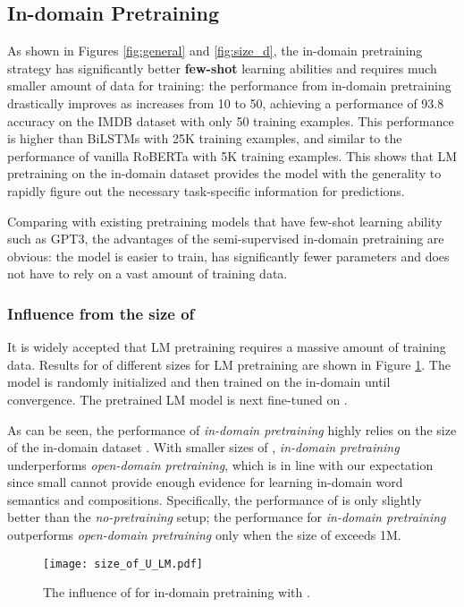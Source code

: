 \documentclass[11pt,a4paper]{article}
\begin{document}
\subsection{In-domain Pretraining}
As shown in Figures \ref{fig:general} and \ref{fig:size_d}, 
the  in-domain pretraining strategy has significantly better {\bf few-shot} learning abilities and
requires much smaller amount of  data for training:
the performance 
from in-domain pretraining
drastically improves as   increases from 10 to  50, 
achieving a performance of 93.8 accuracy on the IMDB dataset with only 50 training examples.
This performance is 
higher 
 than BiLSTMs with 25K training examples, and similar to the performance of vanilla RoBERTa with 5K training examples. 
This shows that  LM pretraining on the in-domain dataset  provides the model with the generality to rapidly figure out the necessary task-specific information for predictions. 

Comparing with existing  pretraining models that have few-shot learning ability such as GPT3, the advantages of the semi-supervised in-domain pretraining are obvious: the model
is easier to train, 
 has significantly fewer parameters and does not have to rely on a vast amount of training data.

\subsubsection{Influence from the size of }
It is widely accepted that LM pretraining requires a massive amount of training data. 
Results for  
of different sizes 
for LM pretraining are shown in  Figure \ref{fig-U-pretrain}.
The model is randomly initialized and then trained on the in-domain  until convergence. 
The pretrained LM model is next 
 fine-tuned on . 

As can be seen, the performance of {\it in-domain pretraining} highly relies on the size of the in-domain dataset . 
With smaller sizes of , {\it in-domain pretraining}  underperforms {\it open-domain pretraining}, which is in line with our expectation since small   cannot provide enough evidence for learning in-domain word semantics and compositions.
Specifically, the performance of  is only slightly better than the {\it no-pretraining} setup;
the performance  for {\it in-domain pretraining} outperforms {\it open-domain pretraining} only when the size of  exceeds 1M. 

\begin{figure}[t]
\center
    \texttt{[image: size\_of\_U\_LM.pdf]}
  \caption{The influence of  for in-domain pretraining with .  }
  \label{fig-U-pretrain}
\end{figure}
\end{document}
